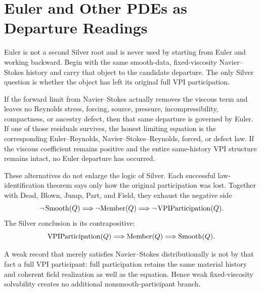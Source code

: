 \section{Euler and Other PDEs as Departure Readings}

Euler is not a second Silver root and is never used by starting from Euler and
working backward.  Begin with the same smooth-data, fixed-viscosity
Navier--Stokes history and carry that object to the candidate departure.  The
only Silver question is whether the object has left its original full VPI
participation.

If the forward limit from Navier--Stokes actually removes the viscous term and
leaves no Reynolds stress, forcing, source, pressure, incompressibility,
compactness, or ancestry defect, then that same departure is governed by
Euler.  If one of those residuals survives, the honest limiting equation is
the corresponding Euler--Reynolds, Navier--Stokes--Reynolds, forced, or defect
law.  If the viscous coefficient remains positive and the entire same-history
VPI structure remains intact, no Euler departure has occurred.

These alternatives do not enlarge the logic of Silver.  Each successful
law-identification theorem says only how the original participation was lost.
Together with Dead, Blown, Jump, Part, and Field, they exhaust the negative
side
\[
  \neg\operatorname{Smooth}(Q)
  \Longrightarrow
  \neg\mathrm{Member}(Q)
  \Longrightarrow
  \neg\operatorname{VPIParticipation}(Q).
\]
The Silver conclusion is its contrapositive:
\[
  \operatorname{VPIParticipation}(Q)
  \Longrightarrow
  \mathrm{Member}(Q)
  \Longrightarrow
  \operatorname{Smooth}(Q).
\]

A weak record that merely satisfies Navier--Stokes distributionally is not by
that fact a full VPI participant: full participation retains the same material
history and coherent field realization as well as the equation.  Hence weak
fixed-viscosity solvability creates no additional nonsmooth-participant branch.
